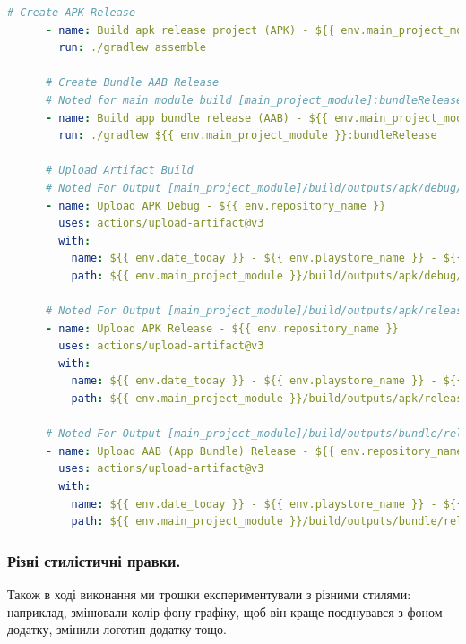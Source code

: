\documentclass[oneside,solution]{android-assign}
\begin{document}
\begin{lstlisting}[language=yaml]
      # Create APK Release
      - name: Build apk release project (APK) - ${{ env.main_project_module }} module
        run: ./gradlew assemble

      # Create Bundle AAB Release
      # Noted for main module build [main_project_module]:bundleRelease
      - name: Build app bundle release (AAB) - ${{ env.main_project_module }} module
        run: ./gradlew ${{ env.main_project_module }}:bundleRelease

      # Upload Artifact Build
      # Noted For Output [main_project_module]/build/outputs/apk/debug/
      - name: Upload APK Debug - ${{ env.repository_name }}
        uses: actions/upload-artifact@v3
        with:
          name: ${{ env.date_today }} - ${{ env.playstore_name }} - ${{ env.repository_name }} - APK(s) debug generated
          path: ${{ env.main_project_module }}/build/outputs/apk/debug/

      # Noted For Output [main_project_module]/build/outputs/apk/release/
      - name: Upload APK Release - ${{ env.repository_name }}
        uses: actions/upload-artifact@v3
        with:
          name: ${{ env.date_today }} - ${{ env.playstore_name }} - ${{ env.repository_name }} - APK(s) release generated
          path: ${{ env.main_project_module }}/build/outputs/apk/release/

      # Noted For Output [main_project_module]/build/outputs/bundle/release/
      - name: Upload AAB (App Bundle) Release - ${{ env.repository_name }}
        uses: actions/upload-artifact@v3
        with:
          name: ${{ env.date_today }} - ${{ env.playstore_name }} - ${{ env.repository_name }} - App bundle(s) AAB release generated
          path: ${{ env.main_project_module }}/build/outputs/bundle/release/
\end{lstlisting}

\subsubsection{Різні стилістичні правки.} Також в ході виконання ми трошки експериментували з різними стилями: наприклад, змінювали колір фону графіку, щоб він краще поєднувався з фоном додатку, змінили логотип додатку тощо.
\end{document}
